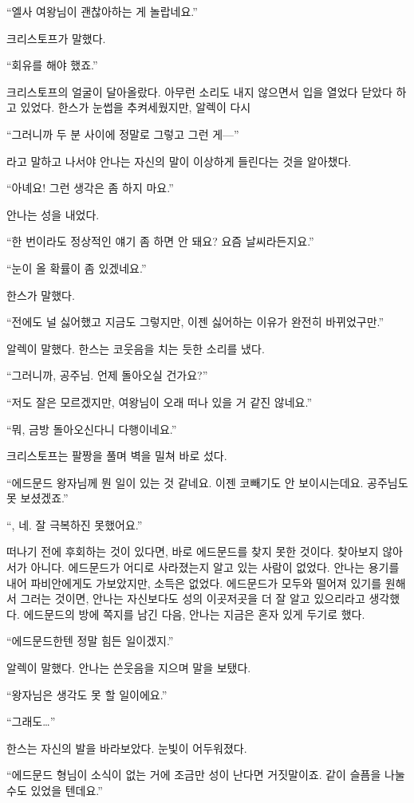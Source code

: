 ``엘사 여왕님이 괜찮아하는 게 놀랍네요.''

크리스토프가 말했다.

`` 회유를 해야 했죠.''

크리스토프의 얼굴이 달아올랐다. 아무런 소리도 내지 않으면서 입을 열었다 닫았다 하고 있었다. 한스가 눈썹을 추켜세웠지만, 알렉이 다시

``그러니까 두 분 사이에 정말로 그렇고 그런 게—''

라고 말하고 나서야 안나는 자신의 말이 이상하게 들린다는 것을 알아챘다.

``아녜요! 그런 생각은 좀 하지 마요.''

안나는 성을 내었다.

``한 번이라도 정상적인 얘기 좀 하면 안 돼요? 요즘 날씨라든지요.''

``눈이 올 확률이 좀 있겠네요.''

한스가 말했다.

``전에도 널 싫어했고 지금도 그렇지만, 이젠 싫어하는 이유가 완전히 바뀌었구만.''

알렉이 말했다. 한스는 코웃음을 치는 듯한 소리를 냈다.

``그러니까, 공주님. 언제 돌아오실 건가요?''

``저도 잘은 모르겠지만, 여왕님이 오래 떠나 있을 거 같진 않네요.''

``뭐, 금방 돌아오신다니 다행이네요.''

크리스토프는 팔짱을 풀며 벽을 밀쳐 바로 섰다.

``에드문드 왕자님께 뭔 일이 있는 것 같네요. 이젠 코빼기도 안 보이시는데요. 공주님도 못 보셨겠죠.''

``, 네. 잘 극복하진 못했어요.''

떠나기 전에 후회하는 것이 있다면, 바로 에드문드를 찾지 못한 것이다. 찾아보지 않아서가 아니다. 에드문드가 어디로 사라졌는지 알고 있는 사람이 없었다. 안나는 용기를 내어 파비안에게도 가보았지만, 소득은 없었다. 에드문드가 모두와 떨어져 있기를 원해서 그러는 것이면, 안나는 자신보다도 성의 이곳저곳을 더 잘 알고 있으리라고 생각했다. 에드문드의 방에 쪽지를 남긴 다음, 안나는 지금은 혼자 있게 두기로 했다.

``에드문드한텐 정말 힘든 일이겠지.''

알렉이 말했다. 안나는 쓴웃음을 지으며 말을 보탰다.

``왕자님은 생각도 못 할 일이에요.''

``그래도\ldots''

한스는 자신의 발을 바라보았다. 눈빛이 어두워졌다.

``에드문드 형님이 소식이 없는 거에 조금만 성이 난다면 거짓말이죠. 같이 슬픔을 나눌 수도 있었을 텐데요.''

